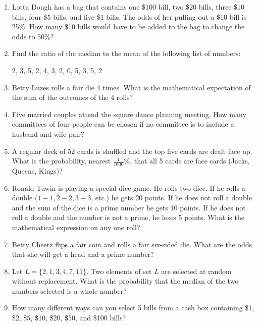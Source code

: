 \documentclass[../uilmath.tex]{subfiles}
\begin{document}
\begin{enumerate}[label=\bfseries\arabic*.]
    \item %
    Lotta Dough has a bag that contains one \$100 bill, two \$20 bills, three \$10 bills, four \$5 bills, and five \$1 bills. The odds of her pulling out a \$10 bill is 25\%. How many 
    \$10 bills would have to be added to the bag to change the odds to 50\%?

    \item %
    Find the ratio of the median to the mean of the following list of numbers:
    \begin{center}
        2, 3, 5, 2, 4, 3, 2, 0, 5, 3, 5, 2
    \end{center}

    \item %
    Betty Luzes rolls a fair die 4 times. What is the mathematical expectation of the sum of the outcomes of the 4 rolls?

    \item %
    Five married couples attend the square dance planning meeting. How many committees of four people can be chosen if no committee is to include a husband-and-wife pair?

    \item %
    A regular deck of 52 cards is shuffled and the top five cards are dealt face up. What is the probability, nearest $\frac{1}{1000}$\%, that all 5 cards are face cards (Jacks, Queens, Kings)?

    \item %
    Ronald Tuwin is playing a special dice game. He rolls two dice. If he rolls a double $(1-1, 2-2,3-3$, etc.) he gets 20 points.
    If he does not roll a double and the sum of the dice is a prime number he gets 10 points. If he does not roll a double and the number is not a prime, he loses 5 points.
    What is the mathematical expression on any one roll?

    \item %
    Betty Cheetz flips a fair coin and rolls a fair six-sided die. What are the odds that she will get a head and a prime number?

    \item %
    Let $L=\{2,1,3,4,7,11\}$. Two elements of set $L$ are selected at random without replacement.
    What is the probability that the median of the two numbers selected is a whole number?

    \item %
    How many different ways can you select 5 bills from a cash box containing \$1, \$2, \$5, \$10, \$20, \$50, and \$100 bills?


\end{enumerate}
\end{document}
